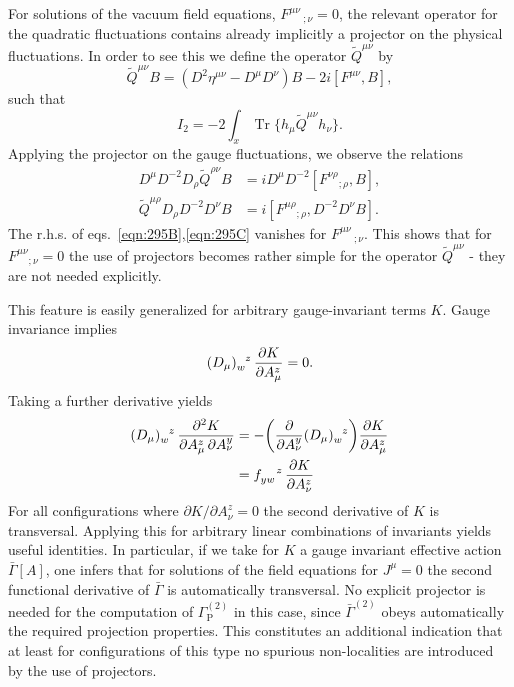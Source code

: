 \documentclass[twocolumn,aps,prd,amsmath,amssymb,preprintnumbers,longbibliography]{revtex4-1}
\numberwithin{equation}{section}
\DeclareMathOperator{\Tr}{Tr}
\newenvironment{alignedeqn}{\begin{equation}\begin{aligned}}{\end{aligned}\end{equation}\ignorespacesafterend}
\begin{document}
For solutions of the vacuum field equations, $F^{\mu\nu}\,_{;\nu}=0$, the relevant operator for the quadratic fluctuations contains already implicitly a projector on the physical fluctuations. In order to see this we define the operator $\tilde{Q}^{\mu\nu}$ by
\begin{equation}\label{eqn:295A}
	\tilde{Q}^{\mu\nu}B
	= (D^2 \eta^{\mu\nu} - D^\mu D^\nu)B - 2 i [F^{\mu\nu},B],
\end{equation}
such that
\begin{equation}
	I_2
	= -2\int_x \Tr\{h_\mu\tilde{Q}^{\mu\nu}h_\nu\}.
\end{equation}
Applying the projector on the gauge fluctuations, we observe the relations
\begin{align}\label{eqn:295B}
	D^\mu D^{-2}D_\rho\tilde{Q}^{\rho\nu}B
	&= i D^\mu D^{-2}[F^{\nu\rho}{_{;\rho}},B],\\
	\label{eqn:295C}
	\tilde{Q}^{\mu\rho}D_\rho D^{-2}D^\nu B
	&= i[F^{\mu\rho}{_{;\rho}},D^{-2}D^\nu B].
\end{align}
The r.h.s. of eqs.~\eqref{eqn:295B},\eqref{eqn:295C} vanishes for $F^{\mu\nu}\,_{;\nu}$. This shows that for $F^{\mu\nu}{_{;\nu}} = 0$ the use of projectors becomes rather simple for the operator $\tilde{Q}^{\mu\nu}$ - they are not needed explicitly.

This feature is easily generalized for arbitrary gauge-invariant terms $K$. Gauge invariance implies
\begin{equation}\label{eqn:78A}
	\tensor{(D_\mu)}{_w^z} \, \frac{\partial K}{\partial A_\mu^z}
	= 0.
\end{equation}
Taking a further derivative yields
\begin{alignedeqn}\label{eqn:78B}
	\tensor{(D_\mu)}{_w^z} \, \frac{\partial^2 K}{\partial A_\mu^z \, \partial A_\nu^y}
	&= -\biggl(\frac{\partial}{\partial A_\nu^y} \tensor{(D_\mu)}{_w^z}\biggr) \frac{\partial K}{\partial A_\mu^z}\\
	&= \tensor{f}{_y_w^z} \, \frac{\partial K}{\partial A_\nu^z}
\end{alignedeqn}
For all configurations where $\partial K/\partial A_\nu^z = 0$ the second derivative of $K$ is transversal. Applying this for arbitrary linear combinations of invariants yields useful identities. In particular, if we take for $K$ a gauge invariant effective action $\bar{\Gamma}[A]$, one infers that for solutions of the field equations for $J^\mu = 0$ the second functional derivative of $\bar{\Gamma}$ is automatically transversal. No explicit projector is needed for the computation of $\Gamma_\text{P}^{(2)}$ in this case, since $\bar{\Gamma}^{(2)}$ obeys automatically the required projection properties. This constitutes an additional indication that at least for configurations of this type no spurious non-localities are introduced by the use of projectors.
\end{document}
